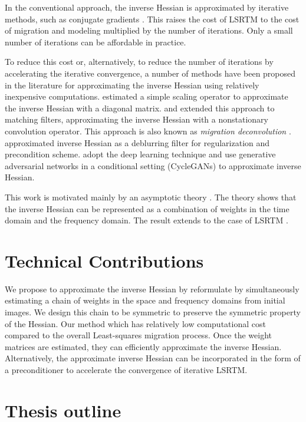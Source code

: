 In the conventional approach, the inverse Hessian is approximated by iterative methods, such as conjugate gradients \cite[]{tarantola,sun,xue}. This raises the cost of LSRTM to the cost of migration and modeling multiplied by the number of iterations. Only a small number of iterations can be affordable in practice. 

To reduce this cost or, alternatively, to reduce the number of iterations by accelerating the iterative convergence, a number of methods have been proposed in the literature for approximating the inverse Hessian using relatively inexpensive computations. \cite{rickett} estimated a simple scaling operator to approximate the inverse Hessian with a diagonal matrix. \cite{guitton} and \cite{greer} extended this approach to matching filters, approximating the inverse Hessian with a nonstationary convolution operator. This approach is also known as \emph{migration deconvolution} \cite[]{hu2001,yu2006}. \cite{aoki} approximated inverse Hessian as a deblurring filter for regularization and precondition scheme. \cite{kaur} adopt the deep learning technique and use generative adversarial networks in a conditional setting (CycleGANs) to approximate inverse Hessian.


This work is motivated mainly by an asymptotic theory \cite[]{miller1987,bleistein1987}. The theory shows that the inverse Hessian can be represented as a combination of weights in the time domain and the frequency domain. The result extends to the case of LSRTM \cite[]{hou15,hou16}. 

\section{Technical Contributions}

We propose to approximate the inverse Hessian by reformulate by simultaneously estimating a chain of weights in the space and frequency domains from initial images. We design this chain to be symmetric to preserve the symmetric property of the Hessian. Our method which has relatively low computational cost compared to the overall Least-squares migration process. Once the weight matrices are estimated, they can efficiently approximate the inverse Hessian. Alternatively, the approximate inverse Hessian can be incorporated in the form of a preconditioner to accelerate the convergence of iterative LSRTM.


\section{Thesis outline}

